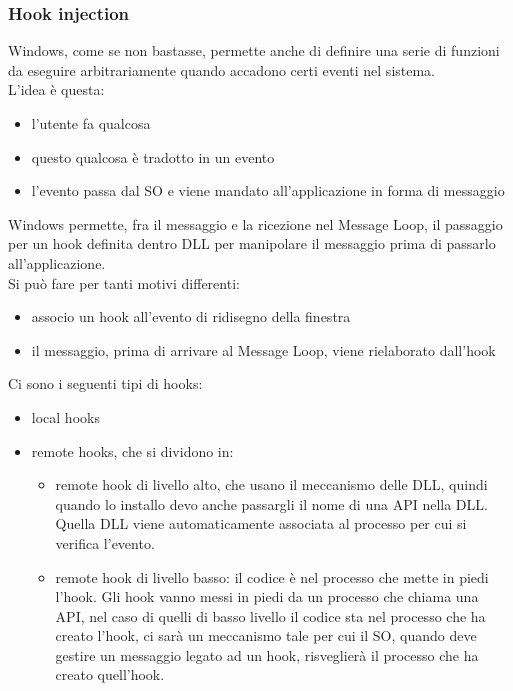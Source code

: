 \documentclass[12pt, oneside]{extbook}
\begin{document}
\subsubsection{Hook injection}
Windows, come se non bastasse, permette anche di definire una serie di funzioni da eseguire arbitrariamente quando accadono certi eventi nel sistema.\\L'idea è questa:
\begin{itemize}
	\item l'utente fa qualcosa
	\item questo qualcosa è tradotto in un evento
	\item l'evento passa dal SO e viene mandato all'applicazione in forma di messaggio
\end{itemize}
Windows permette, fra il messaggio e la ricezione nel Message Loop, il passaggio per un hook definita dentro DLL per manipolare il messaggio prima di passarlo all'applicazione.\\Si può fare per tanti motivi differenti:
\begin{itemize}
	\item associo un hook all'evento di ridisegno della finestra
	\item il messaggio, prima di arrivare al Message Loop, viene rielaborato dall'hook
\end{itemize}
Ci sono i seguenti tipi di hooks:
\begin{itemize}
	\item local hooks
	\item remote hooks, che si dividono in:
	\begin{itemize}
		\item remote hook di livello alto, che usano il meccanismo delle DLL, quindi quando lo installo devo anche passargli il nome di una API nella DLL. Quella DLL viene automaticamente associata al processo per cui si verifica l'evento.
		\item remote hook di livello basso: il codice è nel processo che mette in piedi l'hook. Gli hook vanno messi in piedi da un processo che chiama una API, nel caso di quelli di basso livello il codice sta nel processo che ha creato l'hook, ci sarà un meccanismo tale per cui il SO, quando deve gestire un messaggio legato ad un hook, risveglierà il processo che ha creato quell'hook.
	\end{itemize}
\end{itemize}
\end{document}
